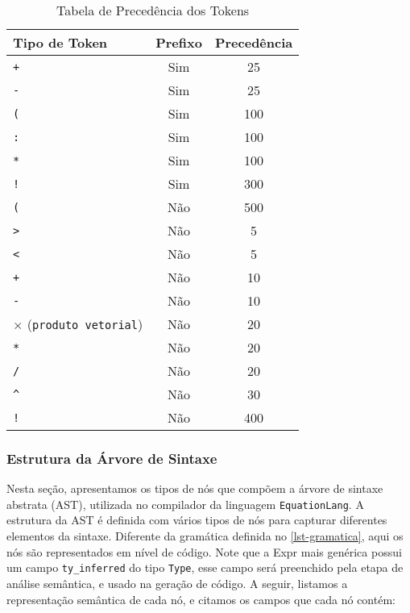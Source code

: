\begin{table}[h!]
\centering
\begin{tabular}{|l|c|c|}
\hline
\textbf{Tipo de Token} & \textbf{Prefixo} & \textbf{Precedência}\\ \hline
\texttt{+}            & Sim              & 25                   \\ \hline
\texttt{-}            & Sim              & 25                   \\ \hline
\texttt{(}            & Sim              & 100                  \\ \hline
\texttt{:}            & Sim              & 100                  \\ \hline
\texttt{*}            & Sim              & 100                  \\ \hline
\texttt{!}            & Sim              & 300                  \\ \hline
\texttt{(}            & Não              & 500                  \\ \hline
\texttt{>}            & Não              & 5                    \\ \hline
\texttt{<}            & Não              & 5                    \\ \hline
\texttt{+}            & Não              & 10                   \\ \hline
\texttt{-}            & Não              & 10                   \\ \hline
$\times$ (\texttt{produto vetorial})        & Não              & 20                   \\ \hline
\texttt{*}            & Não              & 20                   \\ \hline
\texttt{/}            & Não              & 20                   \\ \hline
\texttt{\textasciicircum} & Não           & 30                  \\ \hline
\texttt{!}            & Não              & 400                  \\ \hline
\end{tabular}
\caption{Tabela de Precedência dos Tokens}
\label{tab-token-precedence}
\end{table}


\subsubsection{Estrutura da Árvore de Sintaxe}
Nesta seção, apresentamos os tipos de nós que compõem a árvore de sintaxe abstrata (AST), utilizada no compilador da linguagem \texttt{EquationLang}. A estrutura da AST é definida com vários tipos de nós para capturar diferentes elementos da sintaxe. Diferente da gramática definida no \autoref{lst-gramatica}, aqui os nós são representados em nível de código. Note que a Expr mais genérica possui um campo \texttt{ty\_inferred} do tipo \texttt{Type}, esse campo será preenchido pela etapa de análise semântica, e usado na geração de código. A seguir, listamos a representação semântica de cada nó, e citamos os campos que cada nó contém:

